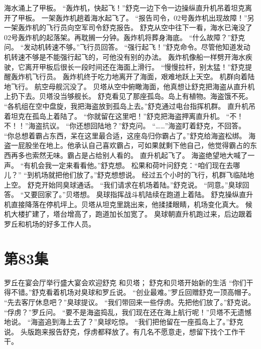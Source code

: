 \documentclass[a4paper,12pt,UTF8,twoside]{ctexbook}
\begin{document}
        海水涌上了甲板。 
        “轰炸机，快起飞！”舒克一边下令一边操纵直升机吊着坦克离开了甲板。 
        一架轰炸机趟着海水起飞了。 
        “报告司令，02号轰炸机出现故障！”另一架轰炸机的飞行员向空军司令舒克报告。 
        舒克从空中往下一看，海水已淹没了02号轰炸机的起落架。再耽搁一分钟。轰炸机将葬身海底。 
        “什么故障？”舒克问。 
        “发动机转速不够。”飞行员回答。 
        “强行起飞！”舒克命令。尽管他知道发动机转速不够是不能强行起飞的，可他没有别的办法。 
        轰炸机像船一样劈开海水疾驶，它离开甲板后很长一段时间还在海面上滑行。 
        “慢慢拉杆，别太猛！”舒克提醒轰炸机飞行员。 
        轰炸机终于吃力地离开了海面，艰难地跃上天空。 
        机群向着陆地飞行。 
        航空母舰沉没了。 
        贝塔从空中俯瞰海面，他真想让舒克把海盗从直升机上扔下去。贝塔没当够舰长。 
        舒克看见了那座孤岛。岛上有植物。海盗饿不死。 
        “各机组在空中盘旋，我把海盗放到孤岛上去。”舒克通过电台指挥机群。 
        直升机吊着坦克在孤岛上着陆了。 
        “你就留在这里吧！”舒克把海盗押离直升机。 
        “不！不！！”海盗抗议。 
        “你还想回陆地？”舒克问。 
        “……”海盗盯着舒克，不回答。 
        “你总想着霸占东西，呆在这里最合适，这座岛归你霸占了。”舒克给海盗松绑。 
        海盗一屁股坐在地上。他承认自己喜欢霸占，可如果就剩下他自己，他觉得霸占的东西再多也索然无味。霸占是占给别人看的。 
        直升机起飞了。 
        海盗绝望地大喊了一声。 
        “有机会我一定来看看他。”舒克想。 
        松果和荷叶问舒克：“咱们现在去哪儿？” 
        “到机场就把他们放了。”舒克想想说。 
        经过五个小时的飞行，机群飞临陆地上空。 
        舒克开始同臭球通话。 
        “我们请求在机场着陆。”舒克说。 
        “同意。”臭球回答。 
        “又要回家了。”贝塔想。 
        臭球指挥战斗机陆续在跑道上着陆。 
        舒克操纵直升机直接降落在停机坪上。贝塔从坦克里跳出来，他揉揉眼睛，机场变化真大。 
        候机大楼扩建了，塔台增高了，跑道加长加宽了。 
        臭球朝直升机跑过来，后边跟着罗丘和机场的好多工作人员。   \chapter{第83集} 
        罗丘在宴会厅举行盛大宴会欢迎舒克 
        和贝塔； 
        舒克和贝塔开始新的生活   
        “你们干得不错。”舒克看着机场对臭球和罗丘说。 
        “创业最难。”罗丘回赠舒克一顶高帽子。 
        “先去客厅休息吧？”臭球提议。 
        “我们带回来一些俘虏。先把他们放了。”舒克说。 
        “俘虏？”罗丘问。 
        “要不是海盗捣乱，我们现在还在海上航行呢！”贝塔不无遗憾地说。 
        “海盗追到海上去了？”臭球吃惊。 
        “我们把他留在一座孤岛上了。”舒克说。 
        头版跑来报告舒克，俘虏都释放了。有几名不愿意走，想留下找个工作干干。 
\end{document}
